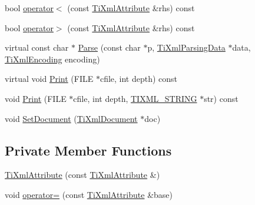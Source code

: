 \begin{DoxyCompactItemize}
bool \hyperlink{class_ti_xml_attribute_a80dcb758cc5ab27ce9865301e2da1335}{operator$<$} (const \hyperlink{class_ti_xml_attribute}{Ti\+Xml\+Attribute} \&rhs) const
\item 
bool \hyperlink{class_ti_xml_attribute_a697c2dde7ac60fccaa7049cee906eb3e}{operator$>$} (const \hyperlink{class_ti_xml_attribute}{Ti\+Xml\+Attribute} \&rhs) const
\item 
virtual const char $\ast$ \hyperlink{class_ti_xml_attribute_ad62774421b814894b995af3b5d231dda}{Parse} (const char $\ast$p, \hyperlink{class_ti_xml_parsing_data}{Ti\+Xml\+Parsing\+Data} $\ast$data, \hyperlink{tinyxml_8h_a88d51847a13ee0f4b4d320d03d2c4d96}{Ti\+Xml\+Encoding} encoding)
\item 
virtual void \hyperlink{class_ti_xml_attribute_a68ae373e03b9c35be4c9d0c3c233b894}{Print} (F\+I\+LE $\ast$cfile, int depth) const
\item 
void \hyperlink{class_ti_xml_attribute_a5c8f72a7d1a49972434d45f4c2889e0e}{Print} (F\+I\+LE $\ast$cfile, int depth, \hyperlink{tinyxml_8h_a92bada05fd84d9a0c9a5bbe53de26887}{T\+I\+X\+M\+L\+\_\+\+S\+T\+R\+I\+NG} $\ast$str) const
\item 
void \hyperlink{class_ti_xml_attribute_ac12a94d4548302afb12f488ba101f7d1}{Set\+Document} (\hyperlink{class_ti_xml_document}{Ti\+Xml\+Document} $\ast$doc)
\end{DoxyCompactItemize}
\subsection*{Private Member Functions}
\begin{DoxyCompactItemize}
\item 
\hyperlink{class_ti_xml_attribute_aee53e434ace7271afc5ce51aeea0b400}{Ti\+Xml\+Attribute} (const \hyperlink{class_ti_xml_attribute}{Ti\+Xml\+Attribute} \&)
\item 
void \hyperlink{class_ti_xml_attribute_a83b9c2a47dbfadf5029f2c0f13c18466}{operator=} (const \hyperlink{class_ti_xml_attribute}{Ti\+Xml\+Attribute} \&base)
\end{DoxyCompactItemize}
